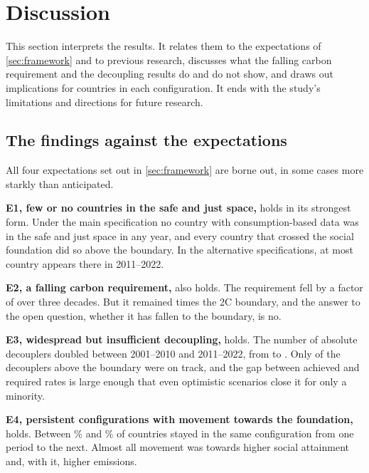 \section{Discussion}\label{sec:discussion}

This section interprets the results. It relates them to the expectations of \cref{sec:framework} and to previous research, discusses what the falling carbon requirement and the decoupling results do and do not show, and draws out implications for countries in each configuration. It ends with the study's limitations and directions for future research.

\subsection{The findings against the expectations}

All four expectations set out in \cref{sec:framework} are borne out, in some cases more starkly than anticipated.

\textbf{E1, few or no countries in the safe and just space,} holds in its strongest form. Under the main specification no country with consumption-based data was in the safe and just space in any year, and every country that crossed the social foundation did so above the boundary. In the alternative specifications, at most \nRobSafeMax{} country appears there in 2011--2022.

\textbf{E2, a falling carbon requirement,} also holds. The requirement fell by a factor of \nReqFactor{} over three decades. But it remained \nReqEndMultiple{} times the 2\textdegree C boundary, and the answer to the open question, whether it has fallen to the boundary, is no.

\textbf{E3, widespread but insufficient decoupling,} holds. The number of absolute decouplers doubled between 2001--2010 and 2011--2022, from \nDecAbsEarly{} to \nDecAbsLate. Only \nDecAboveOnTrack{} of the \nDecAbsAbove{} decouplers above the boundary were on track, and the gap between achieved and required rates is large enough that even optimistic scenarios close it for only a minority.

\textbf{E4, persistent configurations with movement towards the foundation,} holds. Between \nPersistOne\% and \nPersistTwo\% of countries stayed in the same configuration from one period to the next. Almost all movement was towards higher social attainment and, with it, higher emissions.

